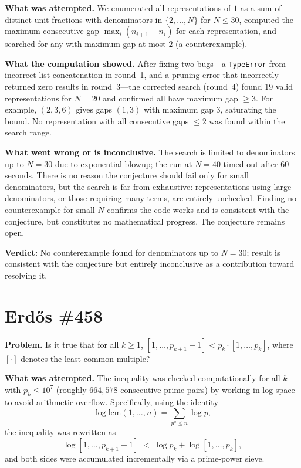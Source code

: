 \documentclass[11pt]{article}
\begin{document}
\textbf{What was attempted.} We enumerated all representations of $1$ as a sum of distinct
unit fractions with denominators in $\{2, \ldots, N\}$ for $N \leq 30$, computed the
maximum consecutive gap $\max_i(n_{i+1}-n_i)$ for each representation, and searched for
any with maximum gap at most $2$ (a counterexample).

\textbf{What the computation showed.} After fixing two bugs---a \texttt{TypeError} from
incorrect list concatenation in round~1, and a pruning error that incorrectly returned
zero results in round~3---the corrected search (round~4) found 19 valid representations
for $N=20$ and confirmed all have maximum gap $\geq 3$. For example,
$(2,3,6)$ gives gaps $(1,3)$ with maximum gap $3$, saturating the bound.
No representation with all consecutive gaps $\leq 2$ was found within the search range.

\textbf{What went wrong or is inconclusive.} The search is limited to denominators up to
$N=30$ due to exponential blowup; the run at $N=40$ timed out after 60 seconds.
There is no reason the conjecture should fail only for small denominators, but the
search is far from exhaustive: representations using large denominators, or those
requiring many terms, are entirely unchecked. Finding no counterexample for small $N$
confirms the code works and is consistent with the conjecture, but constitutes no
mathematical progress. The conjecture remains open.

\textbf{Verdict:} No counterexample found for denominators up to $N=30$; result is
consistent with the conjecture but entirely inconclusive as a contribution toward
resolving it.

\clearpage

\section{Erdős \#458}

\textbf{Problem.} Is it true that for all $k \geq 1$, $[1,\ldots,p_{k+1}-1] < p_k \cdot [1,\ldots,p_k]$, where $[\cdot]$ denotes the least common multiple?

\textbf{What was attempted.} The inequality was checked computationally for all $k$ with $p_k \leq 10^7$ (roughly $664{,}578$ consecutive prime pairs) by working in log-space to avoid arithmetic overflow. Specifically, using the identity
\[
\log \mathrm{lcm}(1,\ldots,n) = \sum_{p^a \leq n} \log p,
\]
the inequality was rewritten as
\[
\log[1,\ldots,p_{k+1}-1] \;<\; \log p_k + \log[1,\ldots,p_k],
\]
and both sides were accumulated incrementally via a prime-power sieve.
\end{document}

